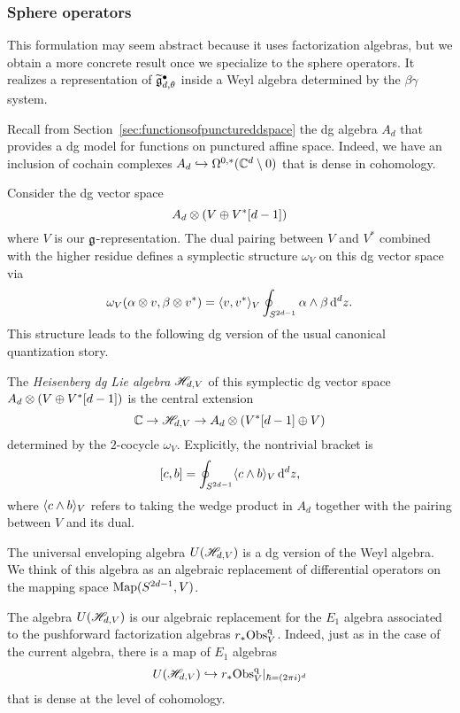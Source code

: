 \subsubsection{Sphere operators}

This formulation may seem abstract because it uses factorization algebras,
but we obtain a more concrete result once we specialize to the sphere operators. 
It realizes a representation of $\widetilde{\mathfrak g}^\bullet_{d,\theta}$ inside a Weyl algebra determined by  the $\beta\gamma$ system.

Recall from Section~\ref{sec:functionsofpunctureddspace} the dg algebra $A_d$ that provides a dg model for functions on punctured affine space.
Indeed, we have an inclusion of cochain complexes $A_d \hookrightarrow \Omega^{0,*}(\mathbb C^d \setminus 0)$ that is dense in cohomology.

Consider the dg vector space
\[
A_d \otimes (V \oplus V^*[d-1])
\]
where $V$ is our $\mathfrak g$-representation. 
The dual pairing between $V$ and $V^*$ combined with the higher residue defines a symplectic structure $\omega_V$ on this dg vector space via
\[
\omega_V(\alpha \otimes v, \beta \otimes v^*) = \langle v, v^*\rangle_V \oint_{S^{2d-1}} \alpha \wedge \beta\, {\rm d}^d z .
\]
This structure leads to the following dg version of the usual canonical quantization story.

\begin{dfn}
The {\em Heisenberg dg Lie algebra} $\mathscr H_{d,V}$ of this symplectic dg vector space $A_d \otimes (V \oplus V^*[d-1])$ is the central extension
\[
\mathbb C \to \mathscr H_{d,V} \to A_d \otimes (V^*[d-1] \oplus V) 
\]
determined by the $2$-cocycle $\omega_V$. 
Explicitly, the nontrivial bracket is
\[
[c, b] =  \oint_{S^{2d-1}} \langle c \wedge b\rangle_V\, {\rm d}^d z,
\]
where $\langle c \wedge b\rangle_V$ refers to taking the wedge product in $A_d$ together with the pairing between $V$ and its dual. 
\end{dfn}

The universal enveloping algebra $U(\mathscr H_{d,V})$ is a dg version of the Weyl algebra.
We think of this algebra as an algebraic replacement of differential operators on the mapping space ${\rm Map}(S^{2d-1},V)$.

The algebra $U(\mathscr H_{d,V})$ is our algebraic replacement for the $E_1$ algebra associated to the pushforward factorization algebras $r_* {\rm Obs}^{\rm q}_{V}$. 
Indeed, just as in the case of the current algebra, there is a map of $E_1$ algebras
\[
U(\mathscr H_{d,V}) \hookrightarrow r_* {\rm Obs}^{\rm q}_{V}|_{\hbar = (2 \pi i)^d}
\]
that is dense at the level of cohomology. 

